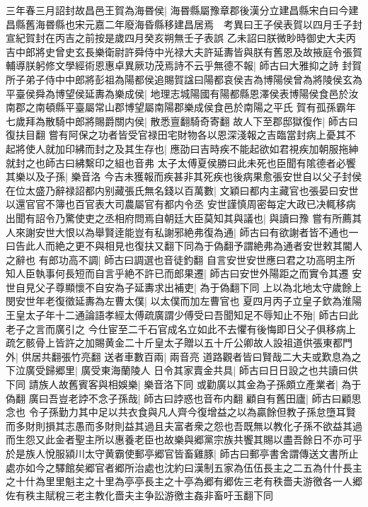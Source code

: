 三年春三月詔封故昌邑王賀為海昬侯|{
	海昬縣屬豫章郡後漢分立建昌縣宋白曰今建昌縣舊海昬縣也宋元嘉二年廢海昏縣移建昌居焉　考異曰王子侯表賀以四月壬子封宣紀賀封在丙吉之前按是歲四月癸亥朔無壬子表誤}
乙未詔曰朕微眇時御史大夫丙吉中郎將史曾史玄長樂衛尉許舜侍中光禄大夫許延夀皆與朕有舊恩及故掖庭令張賀輔導朕躬修文學經術恩惠卓異厥功茂焉詩不云乎無德不報|{
	師古曰大雅抑之詩}
封賀所子弟子侍中中郎將彭祖為陽都侯追賜賀諡曰陽都哀侯吉為博陽侯曾為將陵侯玄為平臺侯舜為博望侯延夀為樂成侯|{
	地理志城陽國有陽都縣恩澤侯表博陽侯食邑於汝南郡之南頓縣平臺屬常山郡博望屬南陽郡樂成侯食邑於南陽之平氏}
賀有孤孫霸年七歲拜為散騎中郎將賜爵關内侯|{
	散悉亶翻騎奇寄翻}
故人下至郡邸獄復作|{
	師古曰復扶目翻}
嘗有阿保之功者皆受官禄田宅財物各以恩深淺報之吉臨當封病上憂其不起將使人就加印紼而封之及其生存也|{
	應劭曰吉時疾不能起欲如君視疾加朝服拖紳就封之也師古曰紼繫印之組也音弗}
太子太傅夏侯勝曰此未死也臣聞有隂德者必饗其樂以及子孫|{
	樂音洛}
今吉未獲報而疾甚非其死疾也後病果愈張安世自以父子封侯在位太盛乃辭禄詔都内别藏張氏無名錢以百萬數|{
	文穎曰都内主藏官也張晏曰安世以還官官不簿也百官表大司農屬官有都内令丞}
安世謹慎周密每定大政已决輒移病出聞有詔令乃驚使吏之丞相府問焉自朝廷大臣莫知其與議也|{
	與讀曰豫}
嘗有所薦其人來謝安世大恨以為舉賢逹能豈有私謝邪絶弗復為通|{
	師古曰有欲謝者皆不通也一曰告此人而絶之更不與相見也復扶又翻下同為于偽翻予謂絶弗為通者安世敕其閽人之辭也}
有郎功高不調|{
	師古曰調選也音徒釣翻}
自言安世安世應曰君之功高明主所知人臣執事何長短而自言乎絶不許已而郎果遷|{
	師古曰安世外陽距之而實令其遷}
安世自見父子尊顯懷不自安為子延夀求出補吏|{
	為于偽翻下同}
上以為北地太守歲餘上閔安世年老復徵延夀為左曹太僕|{
	以太僕而加左曹官也}
夏四月丙子立皇子欽為淮陽王皇太子年十二通論語孝經太傅疏廣謂少傅受曰吾聞知足不辱知止不殆|{
	師古曰此老子之言而廣引之}
今仕宦至二千石官成名立如此不去懼有後悔即日父子俱移病上疏乞骸骨上皆許之加賜黄金二十斤皇太子贈以五十斤公卿故人設祖道供張東都門外|{
	供居共翻張竹亮翻}
送者車數百兩|{
	兩音亮}
道路觀者皆曰賢哉二大夫或歎息為之下泣廣受歸郷里|{
	廣受東海蘭陵人}
日令其家賣金共具|{
	師古曰日日設之也共讀曰供下同}
請族人故舊賓客與相娛樂|{
	樂音洛下同}
或勸廣以其金為子孫頗立產業者|{
	為于偽翻}
廣曰吾豈老誖不念子孫哉|{
	師古曰誖惑也音布内翻}
顧自有舊田廬|{
	師古曰顧思念也}
令子孫勤力其中足以共衣食與凡人齊今復增益之以為贏餘但教子孫怠墮耳賢而多財則損其志愚而多財則益其過且夫富者衆之怨也吾既無以教化子孫不欲益其過而生怨又此金者聖主所以惠養老臣也故樂與郷黨宗族共饗其賜以盡吾餘日不亦可乎於是族人悅服潁川太守黄霸使郵亭郷官皆畜雞豚|{
	師古曰郵亭書舍謂傳送文書所止處亦如今之驛館矣郷官者郷所治處也沈約曰漢制五家為伍伍長主之二五為什什長主之十什為里里魁主之十里為亭亭長主之十亭為郷有郷佐三老有秩嗇夫游徼各一人郷佐有秩主賦稅三老主教化嗇夫主争訟游徼主姦非畜吁玉翻下同}
